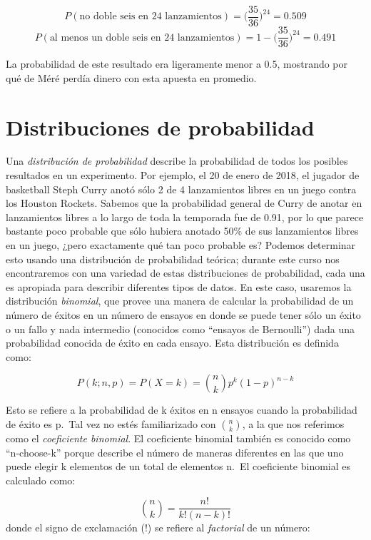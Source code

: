 \documentclass[
  12pt,
]{book}
\begin{document}
\[
P(\text{no doble seis en 24 lanzamientos}) = \bigg(\frac{35}{36}\bigg)^{24}=0.509
\]
\[
P(\text{al menos un doble seis en 24 lanzamientos}) = 1 - \bigg(\frac{35}{36}\bigg)^{24}=0.491
\]

La probabilidad de este resultado era ligeramente menor a 0.5, mostrando por qué de Méré perdía dinero con esta apuesta en promedio.

\hypertarget{distribuciones-de-probabilidad}{%
\section{Distribuciones de probabilidad}\label{distribuciones-de-probabilidad}}

Una \emph{distribución de probabilidad} describe la probabilidad de todos los posibles resultados en un experimento. Por ejemplo, el 20 de enero de 2018, el jugador de basketball Steph Curry anotó sólo 2 de 4 lanzamientos libres en un juego contra los Houston Rockets. Sabemos que la probabilidad general de Curry de anotar en lanzamientos libres a lo largo de toda la temporada fue de 0.91, por lo que parece bastante poco probable que sólo hubiera anotado 50\% de sus lanzamientos libres en un juego, ¿pero exactamente qué tan poco probable es? Podemos determinar esto usando una distribución de probabilidad teórica; durante este curso nos encontraremos con una variedad de estas distribuciones de probabilidad, cada una es apropiada para describir diferentes tipos de datos. En este caso, usaremos la distribución \emph{binomial}, que provee una manera de calcular la probabilidad de un número de éxitos en un número de ensayos en donde se puede tener sólo un éxito o un fallo y nada intermedio (conocidos como ``ensayos de Bernoulli'') dada una probabilidad conocida de éxito en cada ensayo. Esta distribución es definida como:

\[
P(k; n,p) = P(X=k) = \binom{n}{k} p^k(1-p)^{n-k}
\]

Esto se refiere a la probabilidad de k éxitos en n ensayos cuando la probabilidad de éxito es p.~Tal vez no estés familiarizado con \(\binom{n}{k}\), a la que nos referimos como el \emph{coeficiente binomial}. El coeficiente binomial también es conocido como ``n-choose-k'' porque describe el número de maneras diferentes en las que uno puede elegir k elementos de un total de elementos n.~El coeficiente binomial es calculado como:

\[
\binom{n}{k} = \frac{n!}{k!(n-k)!}
\]
donde el signo de exclamación (!) se refiere al \emph{factorial} de un número:
\end{document}
